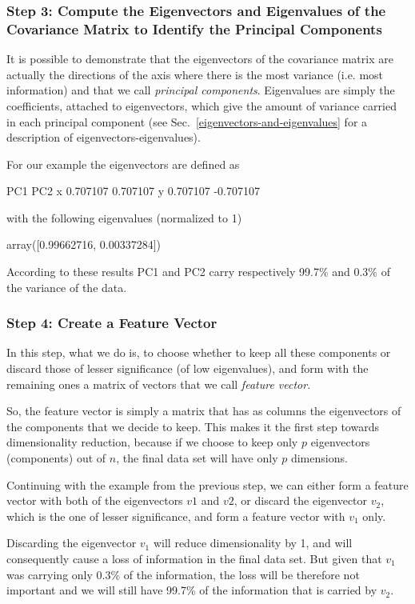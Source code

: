 \subsubsection*{Step 3: Compute the Eigenvectors and Eigenvalues of the Covariance Matrix to Identify the Principal Components}

It is possible to demonstrate that the eigenvectors of the covariance matrix are actually the directions of the axis where there is the most variance (i.e. most information) and that we call \emph{principal components}. Eigenvalues are simply the coefficients, attached to eigenvectors, which give the amount of variance carried in each principal component (see Sec.~\ref{eigenvectors-and-eigenvalues} for a description of eigenvectors-eigenvalues).

For our example the eigenvectors are defined as
\begin{ioutput}
        PC1       PC2
x  0.707107  0.707107
y  0.707107 -0.707107
\end{ioutput}
with the following eigenvalues (normalized to 1)
\begin{ioutput}
array([0.99662716, 0.00337284])
\end{ioutput}

According to these results PC1 and PC2 carry respectively 99.7\% and 0.3\% of the variance of the data.

\subsubsection*{Step 4: Create a Feature Vector}

In this step, what we do is, to choose whether to keep all these components or discard those of lesser significance (of low eigenvalues), and form with the remaining ones a matrix of vectors that we call \emph{feature vector}.

So, the feature vector is simply a matrix that has as columns the eigenvectors of the components that we decide to keep. This makes it the first step towards dimensionality reduction, because if we choose to keep only $p$ eigenvectors (components) out of $n$, the final data set will have only $p$ dimensions.

Continuing with the example from the previous step, we can either form a feature vector with both of the eigenvectors $v1$ and $v2$, or discard the eigenvector $v_2$, which is the one of lesser significance, and form a feature vector with $v_1$ only.

Discarding the eigenvector $v_1$ will reduce dimensionality by 1, and will consequently cause a loss of information in the final data set. But given that $v_1$ was carrying only 0.3\% of the information, the loss will be therefore not important and we will still have 99.7\% of the information that is carried by $v_2$.

